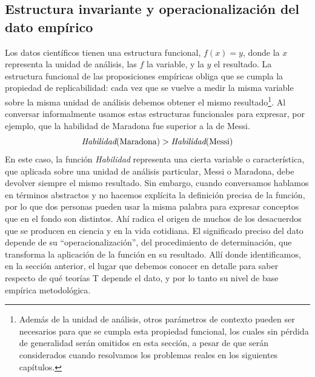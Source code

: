 \documentclass[a4paper,10pt]{book}
\theoremstyle{definition}
\begin{document}
\subsection{Estructura invariante y operacionalización del dato empírico}

Los datos científicos tienen una estructura funcional, $f(x)=y$, donde la $x$ representa la unidad de análisis, las $f$ la variable, y la $y$ el resultado.
%
La estructura funcional de las proposiciones empíricas obliga que se cumpla la propiedad de replicabilidad: cada vez que se vuelve a medir la misma variable sobre la misma unidad de análisis debemos obtener el mismo resultado\footnote{Además de la unidad de análisis, otros parámetros de contexto pueden ser necesarios para que se cumpla esta propiedad funcional, los cuales sin pérdida de generalidad serán omitidos en esta sección, a pesar de que serán considerados cuando resolvamos los problemas reales en los siguientes capítulos.}.
%
Al conversar informalmente usamos estas estructuras funcionales para expresar, por ejemplo, que la habilidad de Maradona fue superior a la de Messi.
%
\begin{equation}\label{eq:opiniones}
 \emph{Habilidad}(\text{Maradona}) > \emph{Habilidad}(\text{Messi})
\end{equation}
%
En este caso, la funci\'on \emph{Habilidad} representa una cierta variable o caracter\'istica, que aplicada sobre una unidad de an\'alisis particular, Messi o Maradona, debe devolver siempre el mismo resultado.
%
Sin embargo, cuando conversamos hablamos en términos abstractos y no hacemos explícita la definici\'on precisa de la funci\'on, por lo que dos personas pueden usar la misma palabra para expresar conceptos que en el fondo son distintos.
%
Ahí radica el origen de muchos de los desacuerdos que se producen en ciencia y en la vida cotidiana.
%
El significado preciso del dato depende de su ``operacionalizaci\'on'', del procedimiento de determinación, que transforma la aplicación de la función en su resultado.
%
Allí donde identificamos, en la sección anterior, el lugar que debemos conocer en detalle para saber respecto de qué teorías T depende el dato, y por lo tanto su nivel de base empírica metodológica.

\end{document}
